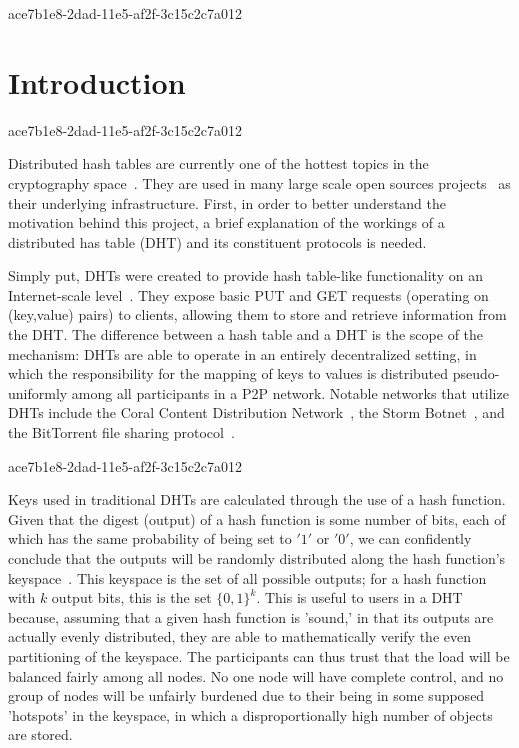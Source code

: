\documentclass[12pt]{article}
\begin{document}
ace7b1e8-2dad-11e5-af2f-3c15c2c7a012\section{Introduction}
ace7b1e8-2dad-11e5-af2f-3c15c2c7a012\par Distributed hash tables are currently one of the hottest topics in the cryptography space~\cite{Stoica:2001dj,Rowstron:2001ea,Ratnasamy:2001wn}. They are used in many large scale open sources projects~\cite{Freitas:2013tb,Xu:2010vs,Perfitt:2010fh} as their underlying infrastructure. First, in order to better understand the motivation behind this project, a brief explanation of the workings of a distributed has table (DHT) and its constituent protocols is needed.

\par Simply put, DHTs were created to provide hash table-like functionality on an Internet-scale level~\cite{Ratnasamy:2001wn}. They expose basic PUT and GET requests (operating on (key,value) pairs) to clients, allowing them to store and retrieve information from the DHT. The difference between a hash table and a DHT is the scope of the mechanism: DHTs are able to operate in an entirely decentralized setting, in which the responsibility for the mapping of keys to values is distributed pseudo-uniformly among all participants in a P2P network. Notable networks that utilize DHTs include the Coral Content Distribution Network~\cite{Freedman:2004vb}, the Storm Botnet~\cite{Holz:2008uk}, and the BitTorrent file sharing protocol~\cite{Cohen:y1_8mBnw}.

ace7b1e8-2dad-11e5-af2f-3c15c2c7a012\par Keys used in traditional DHTs are calculated through the use of a hash function. Given that the digest (output) of a hash function is some number of bits, each of which has the same probability of being set to $'1'$ or $'0'$, we can confidently conclude that the outputs will be randomly distributed along the hash function's keyspace~. This keyspace is the set of all possible outputs; for a hash function with $k$ output bits, this is the set $\{0,1\}^k$. This is useful to users in a DHT because, assuming that a given hash function is 'sound,' in that its outputs are actually evenly distributed, they are able to mathematically verify the even partitioning of the keyspace. The participants can thus trust that the load will be balanced fairly among all nodes. No one node will have complete control, and no group of nodes will be unfairly burdened due to their being in some supposed 'hotspots' in the keyspace, in which a disproportionally high number of objects are stored.~
\end{document}

